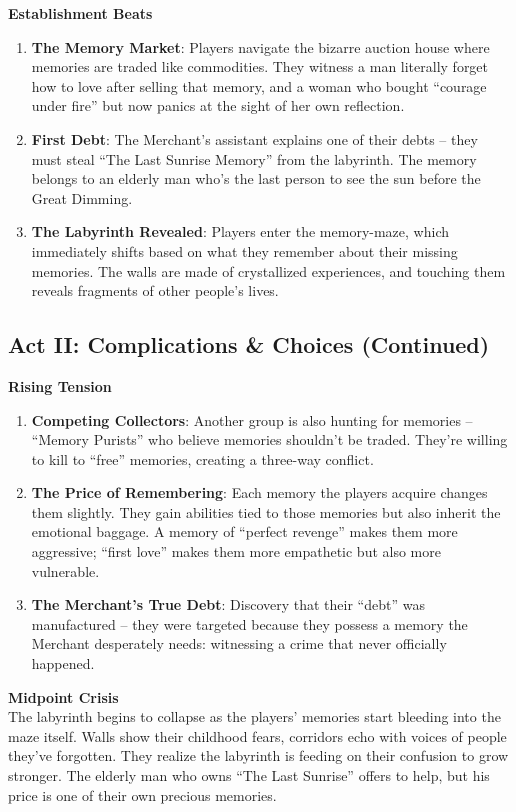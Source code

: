 \documentclass[11pt]{article}
\begin{document}
\textbf{Establishment Beats}
\begin{enumerate}[leftmargin=*]
  \item \textbf{The Memory Market}: Players navigate the bizarre auction house where memories are traded like commodities. They witness a man literally forget how to love after selling that memory, and a woman who bought ``courage under fire'' but now panics at the sight of her own reflection.
  \item \textbf{First Debt}: The Merchant's assistant explains one of their debts -- they must steal ``The Last Sunrise Memory'' from the labyrinth. The memory belongs to an elderly man who's the last person to see the sun before the Great Dimming.
  \item \textbf{The Labyrinth Revealed}: Players enter the memory-maze, which immediately shifts based on what they remember about their missing memories. The walls are made of crystallized experiences, and touching them reveals fragments of other people's lives.
\end{enumerate}

\subsection*{Act II: Complications \& Choices (Continued)}

\textbf{Rising Tension}
\begin{enumerate}[leftmargin=*]
  \item \textbf{Competing Collectors}: Another group is also hunting for memories -- ``Memory Purists'' who believe memories shouldn't be traded. They're willing to kill to ``free'' memories, creating a three-way conflict.
  \item \textbf{The Price of Remembering}: Each memory the players acquire changes them slightly. They gain abilities tied to those memories but also inherit the emotional baggage. A memory of ``perfect revenge'' makes them more aggressive; ``first love'' makes them more empathetic but also more vulnerable.
  \item \textbf{The Merchant's True Debt}: Discovery that their ``debt'' was manufactured -- they were targeted because they possess a memory the Merchant desperately needs: witnessing a crime that never officially happened.
\end{enumerate}

\textbf{Midpoint Crisis} \\
The labyrinth begins to collapse as the players' memories start bleeding into the maze itself. Walls show their childhood fears, corridors echo with voices of people they've forgotten. They realize the labyrinth is feeding on their confusion to grow stronger. The elderly man who owns ``The Last Sunrise'' offers to help, but his price is one of their own precious memories.
\end{document}
